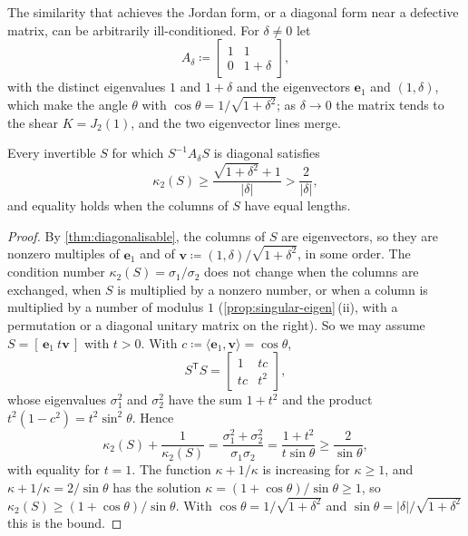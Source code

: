 The similarity that achieves the Jordan form, or a diagonal form near a defective matrix, can be arbitrarily ill-conditioned. For $\delta\ne0$ let
\[
A_\delta\coloneqq\begin{bmatrix}1&1\\0&1+\delta\end{bmatrix},
\]
with the distinct eigenvalues $1$ and $1+\delta$ and the eigenvectors $\mathbf e_1$ and $(1,\delta)$, which make the angle $\theta$ with $\cos\theta=1/\sqrt{1+\delta^2}$; as $\delta\to0$ the matrix tends to the shear $K=J_2(1)$, and the two eigenvector lines merge.

\begin{proposition}
\label{prop:diagonalising-condition}
Every invertible $S$ for which $S^{-1}A_\delta S$ is diagonal satisfies
\[
\kappa_2(S)\ge\frac{\sqrt{1+\delta^2}+1}{|\delta|}>\frac2{|\delta|},
\]
and equality holds when the columns of $S$ have equal lengths.
\end{proposition}

\begin{proof}
By \cref{thm:diagonalisable}, the columns of $S$ are eigenvectors, so they are nonzero multiples of $\mathbf e_1$ and of $\mathbf v\coloneqq(1,\delta)/\sqrt{1+\delta^2}$, in some order. The condition number $\kappa_2(S)=\sigma_1/\sigma_2$ does not change when the columns are exchanged, when $S$ is multiplied by a nonzero number, or when a column is multiplied by a number of modulus $1$ (\cref{prop:singular-eigen}\,(ii), with a permutation or a diagonal unitary matrix on the right). So we may assume $S=[\,\mathbf e_1\ t\mathbf v\,]$ with $t>0$. With $c\coloneqq\langle\mathbf e_1,\mathbf v\rangle=\cos\theta$,
\[
S^{\mathsf T}S=\begin{bmatrix}1&tc\\tc&t^2\end{bmatrix},
\]
whose eigenvalues $\sigma_1^2$ and $\sigma_2^2$ have the sum $1+t^2$ and the product $t^2(1-c^2)=t^2\sin^2\theta$. Hence
\[
\kappa_2(S)+\frac1{\kappa_2(S)}=\frac{\sigma_1^2+\sigma_2^2}{\sigma_1\sigma_2}=\frac{1+t^2}{t\sin\theta}\ge\frac2{\sin\theta},
\]
with equality for $t=1$. The function $\kappa+1/\kappa$ is increasing for $\kappa\ge1$, and $\kappa+1/\kappa=2/\sin\theta$ has the solution $\kappa=(1+\cos\theta)/\sin\theta\ge1$, so $\kappa_2(S)\ge(1+\cos\theta)/\sin\theta$. With $\cos\theta=1/\sqrt{1+\delta^2}$ and $\sin\theta=|\delta|/\sqrt{1+\delta^2}$ this is the bound.
\end{proof}

